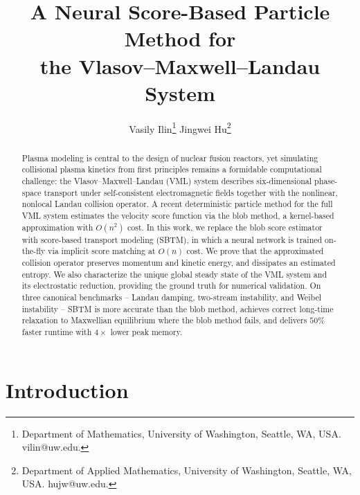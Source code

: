 \documentclass[]{article}
\numberwithin{equation}{section}
\begin{document}
\title{A Neural Score-Based Particle Method for \\the Vlasov--Maxwell--Landau System}

\author{Vasily Ilin\footnote{Department of Mathematics, University of Washington, Seattle, WA, USA. vilin@uw.edu.}
\quad
Jingwei Hu\footnote{Department of Applied Mathematics, University of Washington, Seattle, WA, USA. hujw@uw.edu.}}

\maketitle

\begin{abstract}
Plasma modeling is central to the design of nuclear fusion reactors, yet simulating collisional plasma kinetics from first principles remains a formidable computational challenge: the Vlasov--Maxwell--Landau (VML) system describes six-dimensional phase-space transport under self-consistent electromagnetic fields together with the nonlinear, nonlocal Landau collision operator.  A recent deterministic particle method for the full VML system \cite{bailo2024collisional} estimates the velocity score function via the blob method, a kernel-based approximation with $O(n^2)$ cost.  In this work, we replace the blob score estimator with score-based transport modeling (SBTM), in which a neural network is trained on-the-fly via implicit score matching at $O(n)$ cost.  We prove that the approximated collision operator preserves momentum and kinetic energy, and dissipates an estimated entropy.  We also characterize the unique global steady state of the VML system and its electrostatic reduction, providing the ground truth for numerical validation.  On three canonical benchmarks -- Landau damping, two-stream instability, and Weibel instability -- SBTM is more accurate than the blob method, achieves correct long-time relaxation to Maxwellian equilibrium where the blob method fails, and delivers $50\%$ faster runtime with $4\times$ lower peak memory.
\end{abstract}

\section{Introduction}
\label{sec:intro}
\end{document}

